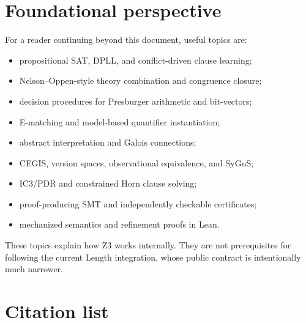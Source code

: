 \documentclass[10pt,letterpaper,oneside]{report}
\begin{document}
\section{Foundational perspective}

For a reader continuing beyond this document, useful topics are:

\begin{itemize}
\item propositional SAT, DPLL, and conflict-driven clause learning;
\item Nelson--Oppen-style theory combination and congruence closure;
\item decision procedures for Presburger arithmetic and bit-vectors;
\item E-matching and model-based quantifier instantiation;
\item abstract interpretation and Galois connections;
\item CEGIS, version spaces, observational equivalence, and SyGuS;
\item IC3/PDR and constrained Horn clause solving;
\item proof-producing SMT and independently checkable certificates;
\item mechanized semantics and refinement proofs in Lean.
\end{itemize}

These topics explain how Z3 works internally. They are not prerequisites for following the current Length integration, whose public contract is intentionally much narrower.

\section{Citation list}
\end{document}
